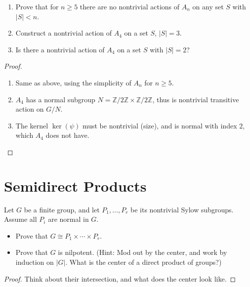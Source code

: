 \documentclass[openany]{book}
\newcommand{\Z}{\mathbb{Z}}
\begin{document}
\begin{prob}[4.19]
    \begin{enumerate}
        \item Prove that for \( n \geq 5 \) there are no nontrivial actions of \( A_n \) on any set \( S \) with \( |S| < n \).
        
        \item Construct a nontrivial action of \( A_4 \) on a set \( S \), \( |S| = 3 \).
        
        \item Is there a nontrivial action of \( A_4 \) on a set \( S \) with \( |S| = 2 \)?
    \end{enumerate}    
\end{prob}
\begin{proof}
    \begin{enumerate}
        \item  Same as above, using the simplicity of $A_n$ for $n\geq 5$.
        \item $A_4$ has a normal subgroup $N=\Z/2\Z\times\Z/2\Z$, thus is nontrivial transitive action on $G/N$.
        \item The kernel $\ker(\psi)$ must be nontrivial (size), and is normal with index $2$, which $A_4$ does not have.
    \end{enumerate}
\end{proof}

\section{Semidirect Products}


\begin{prop}[5.1]
    Let $G$ be a finite group, and let $P_1, \ldots, P_r$ be its nontrivial Sylow subgroups. Assume all $P_i$ are normal in $G$.

\begin{itemize}
    \item Prove that $G \cong P_1 \times \cdots \times P_r$.
    \item Prove that $G$ is nilpotent. (Hint: Mod out by the center, and work by induction on $|G|$. What is the center of a direct product of groups?)
\end{itemize}
\end{prop}
\begin{proof}
    Think about their intersection, and what does the center look like.
\end{proof}
\end{document}
